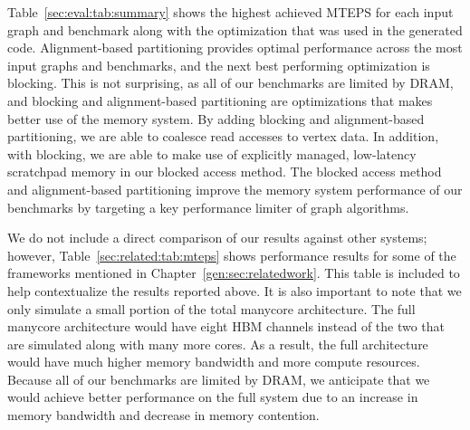 Table~\ref{sec:eval:tab:summary} shows the highest achieved MTEPS for each input graph and benchmark along with the optimization that was used in the generated code.
Alignment-based partitioning provides optimal performance across the most input graphs and benchmarks, and the next best performing optimization is blocking.
This is not surprising, as all of our benchmarks are limited by DRAM, and blocking and alignment-based partitioning are optimizations that makes better use of the memory system.
By adding blocking and alignment-based partitioning, we are able to coalesce read accesses to vertex data.
In addition, with blocking, we are able to make use of explicitly managed, low-latency scratchpad memory in our blocked access method. 
The blocked access method and alignment-based partitioning improve the memory system performance of our benchmarks by targeting a key performance limiter of graph algorithms.

\relatedMTEPSTable

We do not include a direct comparison of our results against other systems; however, Table~\ref{sec:related:tab:mteps} shows performance results for some of the frameworks mentioned in Chapter~\ref{gen:sec:relatedwork}. This table is included to help contextualize the results reported above.
It is also important to note that we only simulate a small portion of the total manycore architecture. 
The full manycore architecture would have eight HBM channels instead of the two that are simulated along with many more cores.
As a result, the full architecture would have much higher memory bandwidth and more compute resources. 
Because all of our benchmarks are limited by DRAM, we anticipate that we would achieve better performance on the full system due to an increase in memory bandwidth and decrease in memory contention.

\overviewResultsTable